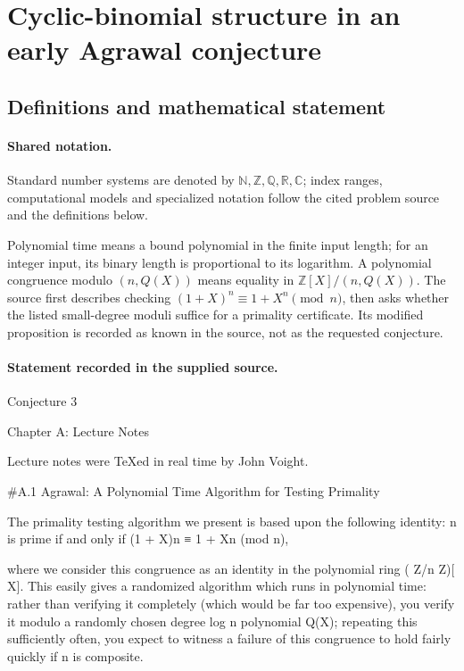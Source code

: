 \documentclass[11pt]{article}
\begin{document}
\section{Cyclic-binomial structure in an early Agrawal conjecture}\label{statement}

\subsection{Definitions and mathematical statement}

\paragraph{Shared notation.}Standard number systems are denoted by $\mathbb N,\mathbb Z,\mathbb Q,\mathbb R,\mathbb C$; index ranges, computational models and specialized notation follow the cited problem source and the definitions below.


Polynomial time means a bound polynomial in the finite input length; for an integer input, its binary length is proportional to its logarithm. A polynomial congruence modulo $(n,Q(X))$ means equality in $\mathbb Z[X]/(n,Q(X))$. The source first describes checking $(1+X)^n\equiv1+X^n\pmod n$, then asks whether the listed small-degree moduli suffice for a primality certificate. Its modified proposition is recorded as known in the source, not as the requested conjecture.
\paragraph{Statement recorded in the supplied source.}
Conjecture 3

Chapter A: Lecture Notes

Lecture notes were TeXed in real time by John Voight.

\#A.1 Agrawal: A Polynomial Time Algorithm for Testing Primality

The primality testing algorithm we present is based upon the following identity: n is prime if and only if (1 + X)n ≡ 1 + Xn (mod n),

where we consider this congruence as an identity in the polynomial ring ( Z/n Z)[ X]. This easily gives a randomized algorithm which runs in polynomial time: rather than verifying it completely (which would be far too expensive), you verify it modulo a randomly chosen degree log n polynomial Q(X); repeating this sufficiently often, you expect to witness a failure of this congruence to hold fairly quickly if n is composite.
\end{document}
